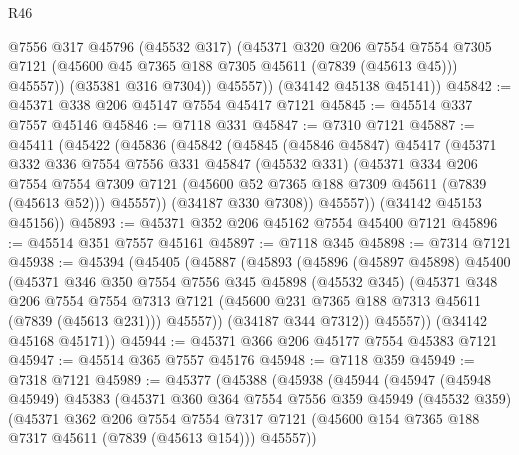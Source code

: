 \begin{lexlean}{R46}
\begin{coremodule}
              @7556
              @317
              @45796
              (@45532 @317)
              (@45371
                @320
                @206
                @7554
                @7554
                @7305
                @7121
                (@45600 @45 @7365 @188 @7305 @45611 (@7839 (@45613 @45)))
                @45557))
            (@35381 @316 @7304))
          @45557))
      (@34142 @45138 @45141))
@45842 := @45371 @338 @206 @45147 @7554 @45417 @7121
@45845 := @45514 @337 @7557 @45146
@45846 := @7118 @331
@45847 := @7310 @7121
@45887 := @45411
    (@45422
      (@45836
        (@45842
          (@45845
            (@45846 @45847)
            @45417
            (@45371
              @332
              @336
              @7554
              @7556
              @331
              @45847
              (@45532 @331)
              (@45371
                @334
                @206
                @7554
                @7554
                @7309
                @7121
                (@45600 @52 @7365 @188 @7309 @45611 (@7839 (@45613 @52)))
                @45557))
            (@34187 @330 @7308))
          @45557))
      (@34142 @45153 @45156))
@45893 := @45371 @352 @206 @45162 @7554 @45400 @7121
@45896 := @45514 @351 @7557 @45161
@45897 := @7118 @345
@45898 := @7314 @7121
@45938 := @45394
    (@45405
      (@45887
        (@45893
          (@45896
            (@45897 @45898)
            @45400
            (@45371
              @346
              @350
              @7554
              @7556
              @345
              @45898
              (@45532 @345)
              (@45371
                @348
                @206
                @7554
                @7554
                @7313
                @7121
                (@45600 @231 @7365 @188 @7313 @45611 (@7839 (@45613 @231)))
                @45557))
            (@34187 @344 @7312))
          @45557))
      (@34142 @45168 @45171))
@45944 := @45371 @366 @206 @45177 @7554 @45383 @7121
@45947 := @45514 @365 @7557 @45176
@45948 := @7118 @359
@45949 := @7318 @7121
@45989 := @45377
    (@45388
      (@45938
        (@45944
          (@45947
            (@45948 @45949)
            @45383
            (@45371
              @360
              @364
              @7554
              @7556
              @359
              @45949
              (@45532 @359)
              (@45371
                @362
                @206
                @7554
                @7554
                @7317
                @7121
                (@45600 @154 @7365 @188 @7317 @45611 (@7839 (@45613 @154)))
                @45557))

\end{coremodule}
\end{lexlean}
